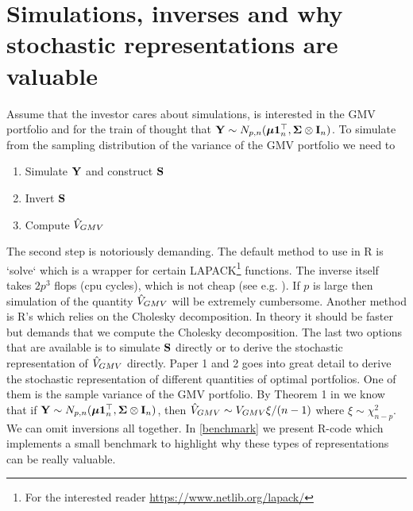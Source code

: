 \documentclass[oneside]{book}\usepackage{knitr}
\begin{document}
\section{Simulations, inverses and why stochastic representations are valuable}
Assume that the investor cares about simulations, is interested in the GMV portfolio and for the train of thought that $\mathbf{Y} \sim N_{p,n}(\mbox{\boldmath$\mu$} \mathbf{1}_n^\top, \mathbf{\Sigma} \otimes \mathbf{I}_n)$. To simulate from the sampling distribution of the variance of the GMV portfolio we need to 
\begin{enumerate}
  \item Simulate $\mathbf{Y}$ and construct $\mathbf{S}$
  \item Invert $\mathbf{S}$
  \item Compute $\hat{V}_{GMV}$
\end{enumerate}
The second step is notoriously demanding.
The default method to use in R is `solve` which is a wrapper for certain LAPACK\footnote{For the interested reader \url{https://www.netlib.org/lapack/}} functions.
The inverse itself takes $2p^3$ flops (cpu cycles), which is not cheap (see e.g. \citet[ch 14]{higham2002accuracy}).
If $p$ is large then simulation of the quantity $\hat{V}_{GMV}$ will be extremely cumbersome.
Another method is R's  which relies on the Cholesky decomposition. 
In theory it should be faster but demands that we compute the Cholesky decomposition.
The last two options that are available is to simulate $\mathbf{S}$ directly or to derive the stochastic representation of $\hat{V}_{GMV}$ directly.
Paper 1 and 2 goes into great detail to derive the stochastic representation of different quantities of optimal portfolios. 
One of them is the sample variance of the GMV portfolio.
By Theorem 1 in \citet{bodnar2020sampling} we know that if $\mathbf{Y} \sim N_{p,n}(\mbox{\boldmath$\mu$} \mathbf{1}_n^\top, \mathbf{\Sigma} \otimes \mathbf{I}_n)$, then $\hat{V}_{GMV} \sim V_{GMV}\xi /(n-1)$ where $\xi \sim \chi^2_{n-p}$.
We can omit inversions all together.
In \ref{benchmark} we present R-code which implements a small benchmark to highlight why these types of representations can be really valuable.
\end{document}
